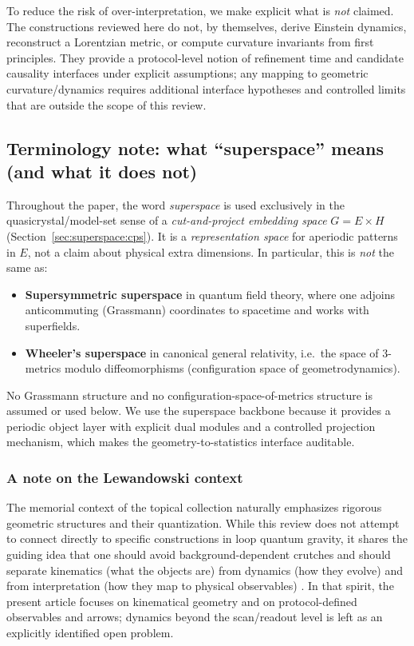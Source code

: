 \begin{remark}\label{rem:intro-nonclaims}
To reduce the risk of over-interpretation, we make explicit what is \emph{not} claimed. The constructions reviewed here do not, by themselves, derive Einstein dynamics, reconstruct a Lorentzian metric, or compute curvature invariants from first principles. They provide a protocol-level notion of refinement time and candidate causality interfaces under explicit assumptions; any mapping to geometric curvature/dynamics requires additional interface hypotheses and controlled limits that are outside the scope of this review.
\end{remark}

\subsection{Terminology note: what ``superspace'' means (and what it does not)}\label{sec:intro:superspace-terminology}

Throughout the paper, the word \emph{superspace} is used exclusively in the quasicrystal/model-set sense of a \emph{cut-and-project embedding space} $G=E\times H$ (Section~\ref{sec:superspace:cps}). It is a \emph{representation space} for aperiodic patterns in $E$, not a claim about physical extra dimensions. In particular, this is \emph{not} the same as:
\begin{itemize}[leftmargin=*,itemsep=2pt]
  \item \textbf{Supersymmetric superspace} in quantum field theory, where one adjoins anticommuting (Grassmann) coordinates to spacetime and works with superfields.
  \item \textbf{Wheeler's superspace} in canonical general relativity, i.e.\ the space of 3-metrics modulo diffeomorphisms (configuration space of geometrodynamics).
\end{itemize}

No Grassmann structure and no configuration-space-of-metrics structure is assumed or used below. We use the superspace backbone because it provides a periodic object layer with explicit dual modules and a controlled projection mechanism, which makes the geometry-to-statistics interface auditable.

\subsubsection{A note on the Lewandowski context}

The memorial context of the topical collection naturally emphasizes rigorous geometric structures and their quantization. While this review does not attempt to connect directly to specific constructions in loop quantum gravity, it shares the guiding idea that one should avoid background-dependent crutches and should separate kinematics (what the objects are) from dynamics (how they evolve) and from interpretation (how they map to physical observables) \cite{AshtekarLewandowski2004}. In that spirit, the present article focuses on kinematical geometry and on protocol-defined observables and arrows; dynamics beyond the scan/readout level is left as an explicitly identified open problem.
